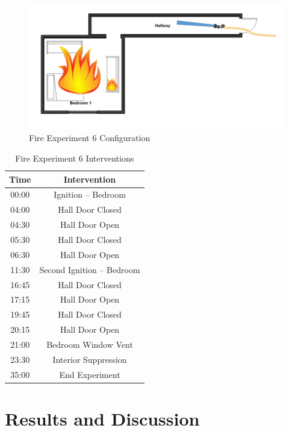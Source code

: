 \documentclass[12pt,oneside]{book}
\begin{document}
\begin{figure}[H]
	\centering
	\includegraphics[width=5in]{Howard_Exp_6.png}
	\caption{Fire Experiment 6 Configuration}
	\label{fig:Exp6Config}
\end{figure}

\begin{table}[H]
	\centering
	\caption{Fire Experiment 6 Interventions}
	\begin{tabular}{|c|c|} 
		\hline
		Time & Intervention \\ \hline \hline
		00:00 & Ignition -- Bedroom \\ \hline
		04:00 & Hall Door Closed \\ \hline
		04:30 & Hall Door Open \\ \hline
		05:30 & Hall Door Closed \\ \hline
		06:30 & Hall Door Open \\ \hline
		11:30 & Second Ignition -- Bedroom \\ \hline
		16:45 & Hall Door Closed \\ \hline
		17:15 & Hall Door Open \\ \hline
		19:45 & Hall Door Closed \\ \hline
		20:15 & Hall Door Open \\ \hline
		21:00 & Bedroom Window Vent \\ \hline
		23:30 & Interior Suppression \\ \hline
		35:00 & End Experiment\\ \hline
	\end{tabular}
	\label{Table:Exp6Interventions}
\end{table}

\clearpage

\chapter{Results and Discussion}
\end{document}
